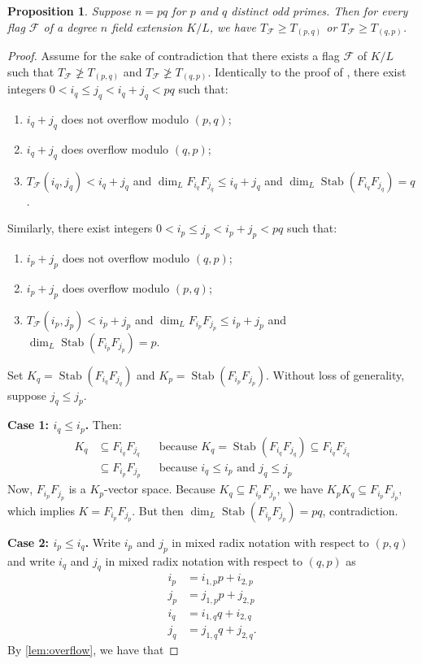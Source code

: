 \documentclass[letterpaper,10pt]{amsart}
\DeclareMathOperator{\Stab}{Stab}
\newcommand{\cF}{\mathcal{F}}
\newtheorem{proposition}[theorem]{Proposition}
\theoremstyle{definition}
\theoremstyle{remark}
\begin{document}
\begin{proposition}
\label{prop:pq}
Suppose $n = pq$ for $p$ and $q$ distinct odd primes. Then for every flag $\cF$ of a degree $n$ field extension $K/L$, we have $T_{\cF} \geq T_{(p,q)}$ or $T_{\cF} \geq T_{(q,p)}$.
\end{proposition}
\begin{proof}
Assume for the sake of contradiction that there exists a flag $\cF$ of $K/L$ such that $T_{\cF} \not \geq T_{(p,q)}$ and $T_{\cF} \not \geq T_{(q,p)}$. Identically to the proof of , there exist integers $0 < i_q \leq j_q < i_q + j_q < pq$ such that:
\begin{enumerate}
\item $i_q + j_q$ does not overflow modulo $(p,q)$;
\item $i_q + j_q$ does overflow modulo $(q,p)$;
\item $T_{\cF}(i_q,j_q) < i_q + j_q$ and $\dim_{L}F_{i_q}F_{j_q} \leq i_q + j_q$ and $\dim_{L}\Stab(F_{i_q}F_{j_q}) = q$. 
\end{enumerate} 
Similarly, there exist integers $0 < i_p \leq j_p < i_p + j_p < pq$ such that:
\begin{enumerate}
\item $i_p + j_p$ does not overflow modulo $(q,p)$;
\item $i_p + j_p$ does overflow modulo $(p,q)$;
\item $T_{\cF}(i_p,j_p) < i_p + j_p$ and $\dim_{L}F_{i_p}F_{j_p} \leq i_p + j_p$ and $\dim_{L}\Stab(F_{i_p}F_{j_p}) = p$. 
\end{enumerate} 
Set $K_q = \Stab(F_{i_q}F_{j_q})$ and $K_p = \Stab(F_{i_p}F_{j_p})$. Without loss of generality, suppose $j_q \leq j_p$.

\noindent \textbf{Case 1: $i_q \leq i_p$.} Then:
\begin{align*}
K_q &\subseteq F_{i_q} F_{j_q} && \text{because $K_q = \Stab(F_{i_q} F_{j_q}) \subseteq  F_{i_q} F_{j_q}$}\\
&\subseteq F_{i_p} F_{j_p} && \text{because $i_q \leq i_p$ and $j_q \leq j_p$}
\end{align*}
Now, $F_{i_p}F_{j_p}$ is a $K_p$-vector space. Because $K_q \subseteq F_{i_p} F_{j_p}$, we have $K_pK_q \subseteq F_{i_p} F_{j_p}$, which implies $K = F_{i_p} F_{j_p}$. But then $\dim_{L}\Stab(F_{i_p} F_{j_p}) = pq$, contradiction. 

\noindent \textbf{Case 2: $i_p \leq i_q$.} Write $i_p$ and $j_p$ in mixed radix notation with respect to $(p,q)$ and write $i_q$ and $j_q$ in mixed radix notation with respect to $(q,p)$ as
\begin{align*}
i_p &= i_{1,p}p + i_{2,p} \\
j_p &= j_{1,p}p + j_{2,p} \\
i_q &= i_{1,q}q + i_{2,q} \\
j_q &= j_{1,q}q + j_{2,q}.
\end{align*} 
By \cref{lem:overflow}, we have that


\end{proof}
\end{document}
